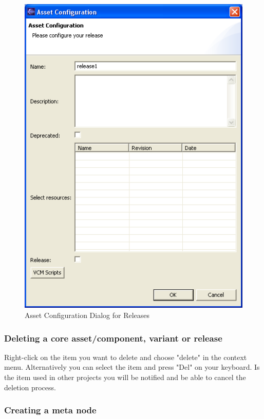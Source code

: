 \begin{figure}[h!]
\begin{center}
\includegraphics[width=12cm]{configrel.png}
   \caption{Asset Configuration Dialog for Releases}
\label{configrel}
\end{center}
\end{figure}\par


\subsubsection{Deleting a core asset/component, variant or release}

Right-click on the item you want to delete and choose "delete" in the context
menu. Alternatively you
can select the item and press "Del" on your keyboard. Is the item used in other projects
you will be notified and be able to cancel the deletion process.


\subsubsection{Creating a meta node}

